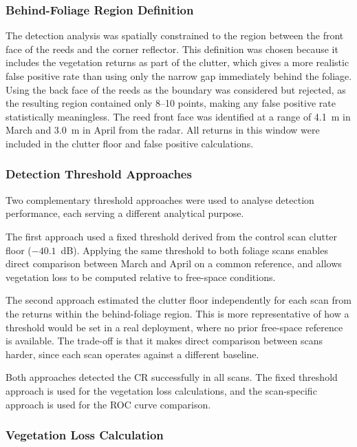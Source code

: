 \subsubsection{Behind-Foliage Region Definition}

The detection analysis was spatially constrained to the region between the front
face of the reeds and the corner reflector.
This definition was chosen because it includes the vegetation returns as part of
the clutter, which gives a more realistic false positive rate than using only the
narrow gap immediately behind the foliage.
Using the back face of the reeds as the boundary was considered but rejected, as
the resulting region contained only 8--10 points, making any false positive rate
statistically meaningless.
The reed front face was identified at a range of 4.1~m in March and 3.0~m in
April from the radar.
All returns in this window were included in the clutter floor and false positive
calculations.

\subsubsection{Detection Threshold Approaches}

Two complementary threshold approaches were used to analyse detection performance,
each serving a different analytical purpose.

The first approach used a fixed threshold derived from the control scan clutter
floor ($-40.1$~dB).
Applying the same threshold to both foliage scans enables direct comparison
between March and April on a common reference, and allows vegetation loss to be
computed relative to free-space conditions.

The second approach estimated the clutter floor independently for each scan from
the returns within the behind-foliage region.
This is more representative of how a threshold would be set in a real deployment,
where no prior free-space reference is available.
The trade-off is that it makes direct comparison between scans harder, since each
scan operates against a different baseline.

Both approaches detected the CR successfully in all scans.
The fixed threshold approach is used for the vegetation loss calculations, and the
scan-specific approach is used for the ROC curve comparison.

\subsubsection{Vegetation Loss Calculation}

